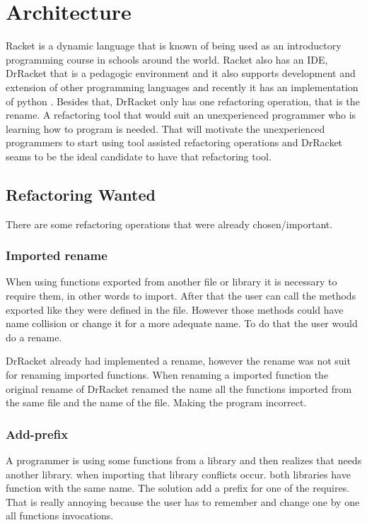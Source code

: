 
% 
% 

\section{Architecture}


Racket is a dynamic language that is known of being used as an introductory programming course in schools around the world. 
Racket also has an IDE, DrRacket that is a pedagogic environment \cite{drscheme_pegadogy} and it also supports development and extension of other programming languages \cite{tobin2011languages} and recently it has an implementation of python \cite{ramos2014implementation}.
Besides that, DrRacket only has one refactoring operation, that is the rename.
A refactoring tool that would suit an unexperienced programmer who is learning how to program is needed. 
That will motivate the unexperienced programmers to start using tool assisted refactoring operations and DrRacket seams to be the ideal candidate to have that refactoring tool.



\subsection{Refactoring Wanted}
There are some refactoring operations that were already chosen/important.
\subsubsection{Imported rename}
When using functions exported from another file or library it is necessary to require them, in other words to import.
After that the user can call the methods exported like they were defined in the file.
However those methods could have name collision or change it for a more adequate name. To do that the user would do a rename.

DrRacket already had implemented a rename, however the rename was not suit for renaming imported functions.
When renaming a imported function the original rename of DrRacket renamed the name all the functions imported from the same file and the name of the file. 
Making the program incorrect.


\subsubsection{Add-prefix}
A programmer is using some functions from a library and then realizes that needs another library. when importing that library conflicts occur.
both libraries have function with the same name. The solution add a prefix for one of the requires.
That is really annoying because the user has to remember and change one by one all functions invocations.

